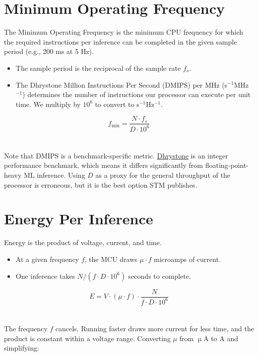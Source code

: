 \documentclass[12pt]{article}
\newcommand{\bigformula}[1]{{\Large \begin{equation} #1 \end{equation}}}
\begin{document}
\section{Minimum Operating Frequency}

The Minimum Operating Frequency is the minimum CPU frequency for which the required instructions per inference can be completed in the given sample period (e.g., 200 ms at 5 Hz).

\begin{itemize}
	\item The sample period is the reciprocal of the sample rate $f_s$. 

	\item The Dhrystone Million Instructions Per Second (DMIPS) per MHz (s$^{-1}$MHz$^{-1}$) determines the number of instructions our processor can execute per unit time. We multiply by $10^6$ to convert to s$^{-1}$Hz$^{-1}$.
\end{itemize}

\bigformula{f_{\min} = \frac{N \cdot f_s}{D \cdot 10^6}}
\\
\\
Note that DMIPS is a benchmark-specific metric. \href{https://homepages.cwi.nl/~steven/dry.c}{Dhrystone} is an integer performance benchmark, which means it differs significantly from floating-point-heavy ML inference. Using $D$ as a proxy for the general throughput of the processor is erroneous, but it is the best option STM publishes.

\section{Energy Per Inference}

Energy is the product of voltage, current, and time.

\begin{itemize}
	\item At a given frequency $f$, the MCU draws $\mu \cdot f$ microamps of current.
	\item One inference takes $N / (f \cdot D \cdot 10^6)$ seconds to complete.
\end{itemize}

{\Large
$$E = V \cdot (\mu \cdot f) \cdot \frac{N}{f \cdot D \cdot 10^6}$$
}
\\
\\
The frequency $f$ cancels. Running faster draws more current for less time, and the product is constant within a voltage range. Converting $\mu$ from $\upmu$A to A and simplifying:
\end{document}

